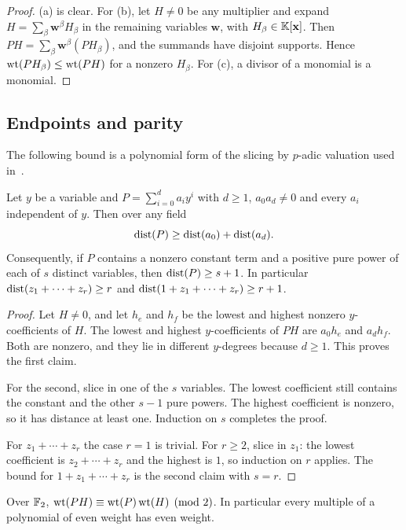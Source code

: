 \begin{proof}
(a) is clear. For (b), let $H\ne0$ be any multiplier and expand $H=\sum_\beta \mathbf{w}^\beta H_\beta$ in the remaining variables $\mathbf{w}$, with $H_\beta\in\mathbb{K}[\mathbf{x}]$. Then $PH=\sum_\beta\mathbf{w}^\beta(PH_\beta)$, and the summands have disjoint supports. Hence $\operatorname{wt}(PH_\beta)\le\operatorname{wt}(PH)$ for a nonzero $H_\beta$. For (c), a divisor of a monomial is a monomial.
\end{proof}

\subsection{Endpoints and parity}
The following bound is a polynomial form of the slicing by $p$-adic valuation used in~\cite[Section~3]{HP}.

\begin{lemma}\label{lem:endpoints}
Let $y$ be a variable and $P=\sum_{i=0}^d a_iy^i$ with $d\ge1$, $a_0a_d\ne0$ and every $a_i$ independent of $y$. Then over any field
\[
                \operatorname{dist}(P)\ge\operatorname{dist}(a_0)+\operatorname{dist}(a_d).
\]
Consequently, if $P$ contains a nonzero constant term and a positive pure power of each of $s$ distinct variables, then $\operatorname{dist}(P)\ge s+1$. In particular $\operatorname{dist}(z_1+\cdots+z_r)\ge r$ and $\operatorname{dist}(1+z_1+\cdots+z_r)\ge r+1$.
\end{lemma}

\begin{proof}
Let $H\ne0$, and let $h_e$ and $h_f$ be the lowest and highest nonzero $y$-coefficients of $H$. The lowest and highest $y$-coefficients of $PH$ are $a_0h_e$ and $a_dh_f$. Both are nonzero, and they lie in different $y$-degrees because $d\ge1$. This proves the first claim.

For the second, slice in one of the $s$ variables. The lowest coefficient still contains the constant and the other $s-1$ pure powers. The highest coefficient is nonzero, so it has distance at least one. Induction on $s$ completes the proof.

For $z_1+\cdots+z_r$ the case $r=1$ is trivial. For $r\ge2$, slice in $z_1$: the lowest coefficient is $z_2+\cdots+z_r$ and the highest is $1$, so induction on $r$ applies. The bound for $1+z_1+\cdots+z_r$ is the second claim with $s=r$.
\end{proof}

\begin{lemma}\label{lem:parity}
Over $\mathbb{F}_2$, $\operatorname{wt}(PH)\equiv\operatorname{wt}(P)\operatorname{wt}(H)\pmod 2$. In particular every multiple of a polynomial of even weight has even weight.
\end{lemma}

